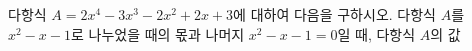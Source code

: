다항식 $A=2x^4-3x^3-2x^2+2x+3$에 대하여 다음을 구하시오.
 다항식 $A$를 $x^2-x-1$로 나누었을 때의 몫과 나머지
 $x^2-x-1=0$일 때, 다항식 $A$의 값
